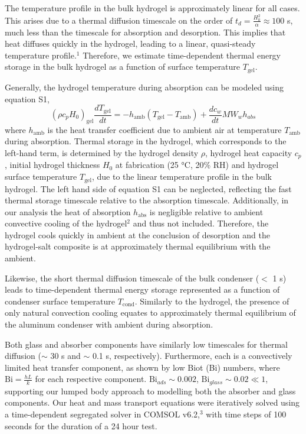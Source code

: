 \documentclass[11pt]{article}
\begin{document}
The temperature profile in the bulk hydrogel is approximately linear for all cases. This arises due to a thermal diffusion timescale on the order of $t_{d} = \frac{H_{0}^{2}}{\alpha} \approx 100$ s, much less than the timescale for absorption and desorption. This implies that heat diffuses quickly in the hydrogel, leading to a linear, quasi-steady temperature profile.$^{1}$ Therefore, we estimate time-dependent thermal energy storage in the bulk hydrogel as a function of surface temperature $T_{\mathrm{gel}}$.

Generally, the hydrogel temperature during absorption can be modeled using equation S1,
\begin{equation}
\left(\rho c_{p} H_{0}\right)_{\mathrm{gel}} \frac{dT_{\mathrm{gel}}}{dt} = -h_{\mathrm{amb}}\left(T_{\mathrm{gel}} - T_{\mathrm{amb}}\right) + \frac{dc_{w}}{dt}MW_{w}h_{abs}
\end{equation}
where $h_{\mathrm{amb}}$ is the heat transfer coefficient due to ambient air at temperature $T_{\mathrm{amb}}$ during absorption. Thermal storage in the hydrogel, which corresponds to the left-hand term, is determined by the hydrogel density $\rho$, hydrogel heat capacity $c_{p}$, initial hydrogel thickness $H_{0}$ at fabrication (25 °C, 20\% RH) and hydrogel surface temperature $T_{\mathrm{gel}}$, due to the linear temperature profile in the bulk hydrogel. The left hand side of equation S1 can be neglected, reflecting the fast thermal storage timescale relative to the absorption timescale. Additionally, in our analysis the heat of absorption $h_{\mathrm{abs}}$ is negligible relative to ambient convective cooling of the hydrogel$^{2}$ and thus not included. Therefore, the hydrogel cools quickly in ambient at the conclusion of desorption and the hydrogel-salt composite is at approximately thermal equilibrium with the ambient.

Likewise, the short thermal diffusion timescale of the bulk condenser ($<$ 1 s) leads to time-dependent thermal energy storage represented as a function of condenser surface temperature $T_{\mathrm{cond}}$. Similarly to the hydrogel, the presence of only natural convection cooling equates to approximately thermal equilibrium of the aluminum condenser with ambient during absorption.

Both glass and absorber components have similarly low timescales for thermal diffusion ($\sim$ 30 s and $\sim$ 0.1 s, respectively). Furthermore, each is a convectively limited heat transfer component, as shown by low Biot (Bi) numbers, where $\mathrm{Bi} = \frac{hL}{k}$ for each respective component. $\mathrm{Bi}_{ads} \sim 0.002$, $\mathrm{Bi}_{glass} \sim 0.02 \ll 1$, supporting our lumped body approach to modelling both the absorber and glass components. Our heat and mass transport equations were iteratively solved using a time-dependent segregated solver in COMSOL v6.2,$^{3}$ with time steps of 100 seconds for the duration of a 24 hour test.
\end{document}
